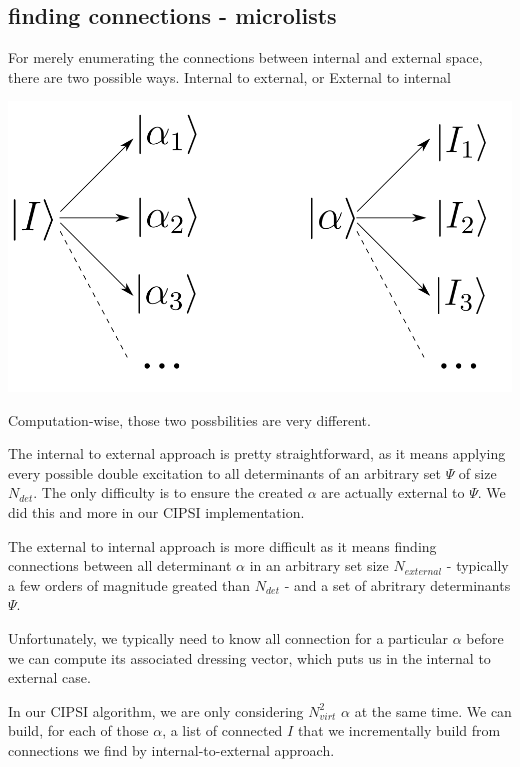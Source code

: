 \documentclass[./thesis.tex]{subfiles}
\begin{document}
\subsection{finding connections - microlists}

For merely enumerating the connections between internal and external space, there are two possible ways.
Internal to external, or External to internal
	\begin{center}
		\includegraphics[width=0.5\columnwidth]{figures/matrix_dressing/interactions}
	\end{center}

Computation-wise, those two possbilities are very different.

The internal to external approach is pretty straightforward, as it means applying every possible double excitation to all determinants of an arbitrary set $\Psi$ of size $N_{det}$. The only difficulty is to ensure the created $\alpha$ are actually external to $\Psi$. We did this and more in our CIPSI implementation.

The external to internal approach is more difficult as it means finding connections between all determinant $\alpha$ in an arbitrary set size $N_{external}$ - typically a few orders of magnitude greated than $N_{det}$ - and a set of abritrary determinants $\Psi$. 

Unfortunately, we typically need to know all connection for a particular $\alpha$ before we can compute its associated dressing vector, which puts us in the internal to external case.

In our CIPSI algorithm, we are only considering $N_{virt}^2$ $\alpha$ at the same time. We can build, for each of those $\alpha$, a list of connected $I$ that we incrementally build from connections we find by internal-to-external approach.
\end{document}
